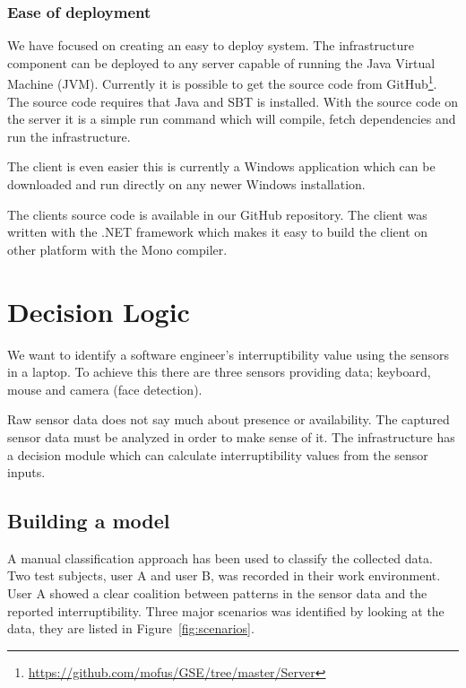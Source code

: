 \documentclass{sigchi}
\begin{document}
\subsubsection{Ease of deployment}
We have focused on creating an easy to deploy system.
The infrastructure component can be deployed to any server capable of running the Java Virtual Machine (JVM).
Currently it is possible to get the source code from GitHub\footnote{\url{https://github.com/mofus/GSE/tree/master/Server}}.
The source code requires that Java and SBT is installed.
With the source code on the server it is a simple run command which will compile, fetch dependencies and run the infrastructure.

The client is even easier this is currently a Windows application which can be downloaded and run directly on any newer Windows installation.

The clients source code is available in our GitHub repository.
The client was written with the .NET framework which makes it easy to build the client on other platform with the Mono compiler.

\section{Decision Logic}
\label{sec:decision_logic}
We want to identify a software engineer’s interruptibility value using the sensors in a laptop.
To achieve this there are three sensors providing data; keyboard, mouse and camera (face detection).

Raw sensor data does not say much about presence or availability.
The captured sensor data must be analyzed in order to make sense of it.
The infrastructure has a decision module which can calculate interruptibility values from the sensor inputs.

\subsection{Building a model}
A manual classification approach has been used to classify the collected data.
Two test subjects, user A and user B, was recorded in their work environment.
User A showed a clear coalition between patterns in the sensor data and the reported interruptibility.
Three major scenarios was identified by looking at the data, they are listed in Figure~\ref{fig:scenarios}.
\end{document}
